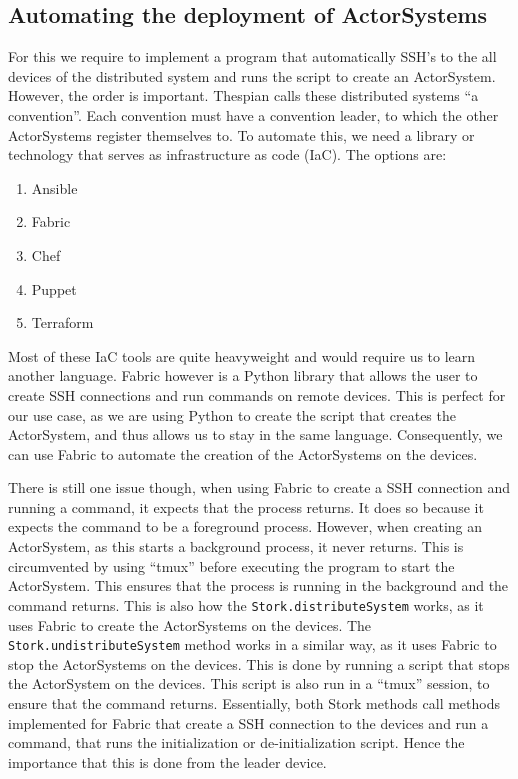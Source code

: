 \documentclass[a4paper]{article}
\begin{document}
\subsection{Automating the deployment of ActorSystems}
For this we require to implement a program that automatically SSH's to the all devices of the distributed system and runs the script to create an ActorSystem. However, the order is important. Thespian calls these distributed systems \enquote{a convention}. Each convention must have a convention leader, to which the other ActorSystems register themselves to.
To automate this, we need a library or technology that serves as infrastructure as code (IaC). The options are:
\begin{enumerate}
    \item Ansible
    \item Fabric
    \item Chef
    \item Puppet
    \item Terraform
\end{enumerate}
Most of these IaC tools are quite heavyweight and would require us to learn another language. Fabric however is a Python library that allows the user to create SSH connections and run commands on remote devices. This is perfect for our use case, as we are using Python to create the script that creates the ActorSystem, and thus allows us to stay in the same language. Consequently, we can use Fabric to automate the creation of the ActorSystems on the devices.

There is still one issue though, when using Fabric to create a SSH connection and running a command, it expects that the process returns. It does so because it expects the command to be a foreground process. However, when creating an ActorSystem, as this starts a background process, it never returns. This is circumvented by using \enquote{tmux} before executing the program to start the ActorSystem. This ensures that the process is running in the background and the command returns. This is also how the \lstinline|Stork.distributeSystem| works, as it uses Fabric to create the ActorSystems on the devices. The \lstinline|Stork.undistributeSystem| method works in a similar way, as it uses Fabric to stop the ActorSystems on the devices. This is done by running a script that stops the ActorSystem on the devices. This script is also run in a \enquote{tmux} session, to ensure that the command returns. Essentially, both Stork methods call methods implemented for Fabric that create a SSH connection to the devices and run a command, that runs the initialization or de-initialization script. Hence the importance that this is done from the leader device.
\end{document}
